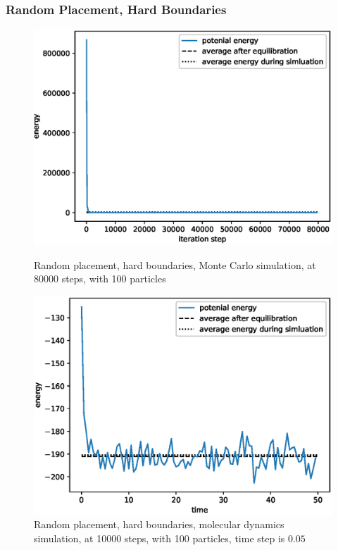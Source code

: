 \documentclass[UTF8,a4paper]{article}
\begin{document}
\subsubsection{Random Placement, Hard Boundaries}
\begin{figure}[H]
	\centering
	\begin{minipage}[t]{0.45\textwidth}
		\centering
		\includegraphics[height=0.2\textheight]{fig/plot_hb_80000_steps_100_particles_0.8442_rho_0.728_tempure_1.eps}
		\caption{Random placement, hard boundaries, Monte Carlo simulation, at 80000 steps, with 100 particles}
	\end{minipage}\hspace{0.5cm}
	\begin{minipage}[t]{0.45\textwidth}
		\centering
		\includegraphics[height=0.2\textheight]{fig/md_plot_rand_hard_10000_steps_100_particles_0.8442_rho_0.728_tempure_.eps}
		\caption{Random placement, hard boundaries, molecular dynamics simulation, at 10000 steps, with 100 particles, time step is $0.05$}
	\end{minipage}
\end{figure}
\end{document}
